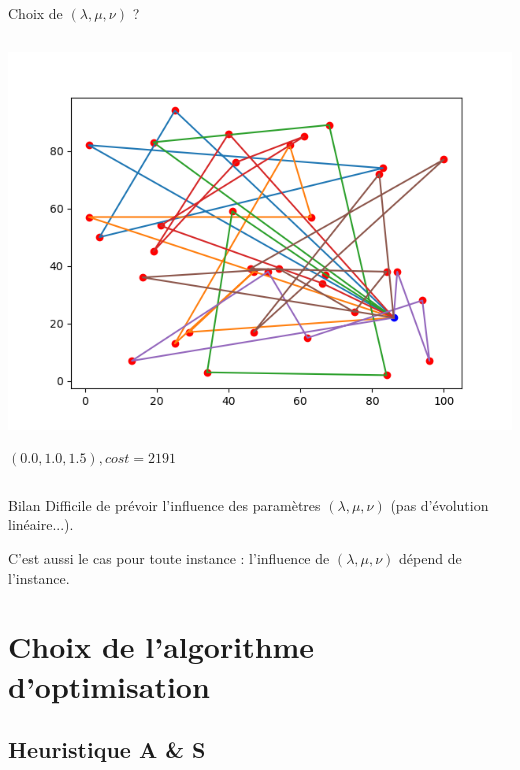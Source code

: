 \documentclass{beamer}
\begin{document}
\begin{frame}{Choix de $(\lambda,\mu,\nu)$ ?}
\begin{columns}[t]
 
  \begin{column}{4cm}
  	\centering
	\includegraphics[scale=0.27]{resCW001015.png}
	
 	$(0.0,1.0,1.5), cost = 2191$

  \end{column}
 \end{columns}
 
\begin{alertblock}{Bilan}
Difficile de prévoir l'influence des paramètres $(\lambda,\mu,\nu)$ (pas d'évolution linéaire...). 

C'est aussi le cas pour toute instance : l'influence de $(\lambda,\mu,\nu)$ dépend de l'instance.
\end{alertblock}

\end{frame}

\section{Choix de l'algorithme d'optimisation}

\subsection{Heuristique A \& S}
\end{document}
